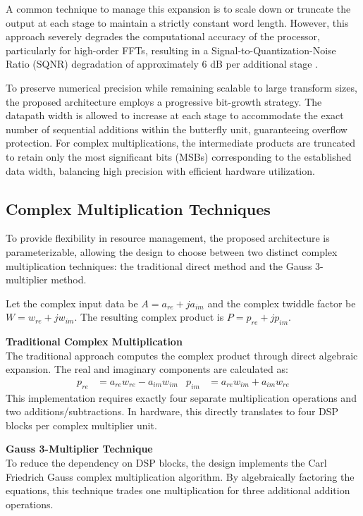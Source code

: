 A common technique to manage this expansion is to scale down or truncate the output at each stage to maintain a strictly constant word length. However, this approach severely degrades the computational accuracy of the processor, particularly for high-order FFTs, resulting in a Signal-to-Quantization-Noise Ratio (SQNR) degradation of approximately 6 dB per additional stage \cite{garcia2007fpga}.

To preserve numerical precision while remaining scalable to large transform sizes, the proposed architecture employs a progressive bit-growth strategy. The datapath width is allowed to increase at each stage to accommodate the exact number of sequential additions within the butterfly unit, guaranteeing overflow protection. For complex multiplications, the intermediate products are truncated to retain only the most significant bits (MSBs) corresponding to the established data width, balancing high precision with efficient hardware utilization.

\subsection{Complex Multiplication Techniques}

To provide flexibility in resource management, the proposed architecture is parameterizable, allowing the design to choose between two distinct complex multiplication techniques: the traditional direct method and the Gauss 3-multiplier method.

Let the complex input data be $A = a_{re} + j a_{im}$ and the complex twiddle factor be $W = w_{re} + j w_{im}$. The resulting complex product is $P = p_{re} + j p_{im}$.

\textbf{Traditional Complex Multiplication} \\
The traditional approach computes the complex product through direct algebraic expansion. The real and imaginary components are calculated as:
\begin{align}
    p_{re} &= a_{re}w_{re} - a_{im}w_{im} & p_{im} &= a_{re}w_{im} + a_{im}w_{re} \label{eq:trad_mult}
\end{align}
This implementation requires exactly four separate multiplication operations and two additions/subtractions. In hardware, this directly translates to four DSP blocks per complex multiplier unit.

\textbf{Gauss 3-Multiplier Technique} \\
To reduce the dependency on DSP blocks, the design implements the Carl Friedrich Gauss complex multiplication algorithm. By algebraically factoring the equations, this technique trades one multiplication for three additional addition operations.

